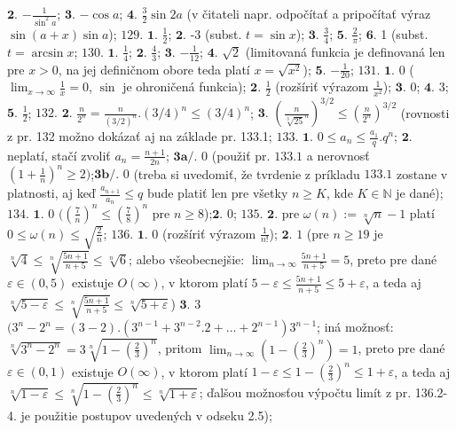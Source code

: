 $\boldsymbol{2.}$
$-\frac{1}{\sin ^{2}a} $;
$\boldsymbol{3.}$
$- \cos a$;
$\boldsymbol{4.}$
$\frac{3}{2} \sin 2a $ (v čitateli napr. odpočítať a pripočítať výraz $\sin ( a+x) \sin a$);
$\boxed{129.}$
$\boldsymbol{1.}$ 
$\frac{1}{2} $;
$\boldsymbol{2.}$ -3 (subst. $ t= \sin x$);
$\boldsymbol{3.}$
$\frac{3}{4} $;
$\boldsymbol{5.}$
$\frac{2}{\pi} $;
$\boldsymbol{6.}$
1 (subst. $t = \arcsin x $;
$\boxed{130.}$
$\boldsymbol{1.}$ 
$\frac{1}{4} $;
$\boldsymbol{2.}$ 
$\frac{4}{3} $;
$\boldsymbol{3.}$ 
$-\frac{1}{12} $;
$\boldsymbol{4.}$ 
$\sqrt{2} $ (limitovaná funkcia je definovaná len pre $ x>0$, na jej definičnom obore teda platí $x= \sqrt{x^{2}} $);
$\boldsymbol{5.}$ 
$-\frac{1}{20} $;
$\boxed{131.}$
$\boldsymbol{1.}$ 
0 ($\lim_{x \to \infty}  \frac{1}{x}=0$, $\sin  $ je ohroničená funkcia);
$\boldsymbol{2.}$ 
$\frac{1}{2} $ (rozšíriť výrazom $\frac{1}{x^{2}} $);
$\boldsymbol{3.}$ 0;
$\boldsymbol{4.}$ 3;
$\boldsymbol{5.}$
$\frac{1}{2}$;
$\boxed{132.}$
$\boldsymbol{2.}$ 
$\frac{n}{2^{n}}= \frac{n}{(3/2)^{n}}.(3/4)^{n}\leq (3/4)^{n}$;
$\boldsymbol{3.}$
$( \frac{n}{\sqrt[3]{25}^{n}})^{3/2}\leq (\frac{n}{2^{n}})^{3/2}$ (rovnosti z pr. 132 možno dokázať aj na základe pr. 133.1;
$\boxed{133.}$
$\boldsymbol{1.}$ 
 $ 0 \leq a_{n} \leq \frac{a_{1}}{q}.q^{n}  $;
$\boldsymbol{2.}$ neplatí, stačí zvoliť  $ a_{n}= \frac{n+1}{2n}$;
$\boldsymbol{3a/.}$ $0$ (použiť pr. $133.1$ a nerovnosť $(1+ \frac{1}{n})^{n}\geq 2) $;$\boldsymbol{3b/.}$ $0$ (treba si uvedomiť, že tvrdenie z príkladu $133.1$ zostane v platnosti, aj keď $\frac{a_{n+1}}{a_{n}}\leq q$ bude platiť len pre všetky $n\geq K$, kde $K\in \mathbb{N}$ je dané);
$\boxed{134.}$
$\boldsymbol{1.}$ $0$ $((\frac{7}{n})^{n}\leq (\frac{7}{8})^{n}$ pre $n\geq 8$);$\boldsymbol{2.}$ $0$;
$\boxed{135.}$
$\boldsymbol{2.}$
pre $\omega(n):=\sqrt[n]{n}-1$ platí $0\leq \omega(n) \leq \sqrt{\frac{2}{n}}$;
$\boxed{136.}$
$\boldsymbol{1.}$  $0$ (rozšíriť výrazom $\frac{1}{n!}$);
$\boldsymbol{2.}$  $1$ (pre $n\geq 19 $ je $\sqrt[n]{4}\leq \sqrt[n]{\frac{5n+1}{n+5}} \leq \sqrt[n]{6} $; alebo všeobecnejšie: $\lim_{n\rightarrow\infty} \frac{5n+1}{n+5} =5$, preto pre dané $\varepsilon \in (0,5) $ existuje $O (\infty )$, v ktorom platí $5- \varepsilon \leq \frac{5n+1}{n+5} \leq 5+ \varepsilon $, a teda aj $\sqrt[n]{5- \varepsilon} \leq  \sqrt[n]{\frac{5n+1}{n+5}}\leq \sqrt[n]{5+ \varepsilon} $)
$\boldsymbol{3.}$  
$3$ $ (3^{n}-2^{n} = (3-2).(3^{n-1}+3^{n-2}.2+...+2^{n-1}) 3^{n-1}$; iná možnosť: $ \sqrt[n]{3^{n}-2^{n}}= 3 \sqrt[n]{1-(\frac{2}{3})^{n}}$, pritom $\lim_{n\rightarrow\infty} (1- ( \frac{2}{3})^{n})=1$, preto pre dané $\varepsilon \in (0,1) $  existuje $O( \infty )$, v ktorom platí $1- \varepsilon \leq 1- (\frac{2}{3})^{n} \leq 1+ \varepsilon $, a teda aj $ \sqrt[n]{1- \varepsilon } \leq \sqrt[n ]{1- (\frac{2}{3})^{n}} \leq \sqrt[n]{1+ \varepsilon }$; ďalšou možnosťou výpočtu limít z pr. 136.2-4. je použitie postupov uvedených v odseku 2.5);
